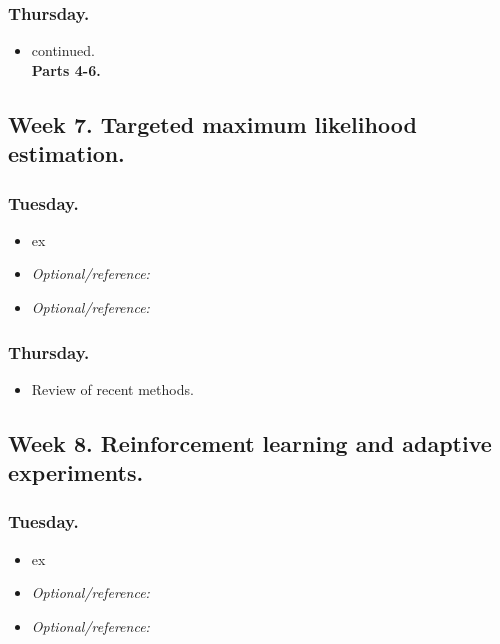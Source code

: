 \documentclass[letterpaper, 12pt, parskip=full,DIV=10]{scrartcl}
\begin{document}
\subsubsection*{Thursday.}
\begin{itemize}
\item \cite{chernozhukov2018double} continued.  \\
\textbf{Parts 4-6.}%
\end{itemize}



\subsection*{Week 7. Targeted maximum likelihood estimation.}
\subsubsection*{Tuesday.}

\begin{itemize}
\item {}  ex
\item  \textit{Optional/reference:}  
\item  \textit{Optional/reference:}  
\end{itemize}

\subsubsection*{Thursday.}

\begin{itemize}
\item Review of recent methods. 
\end{itemize}

\subsection*{Week 8. Reinforcement learning and adaptive experiments.}

\subsubsection*{Tuesday.}
\begin{itemize}
\item {}  ex
\item  \textit{Optional/reference:}  
\item  \textit{Optional/reference:}  
\end{itemize}
\end{document}
